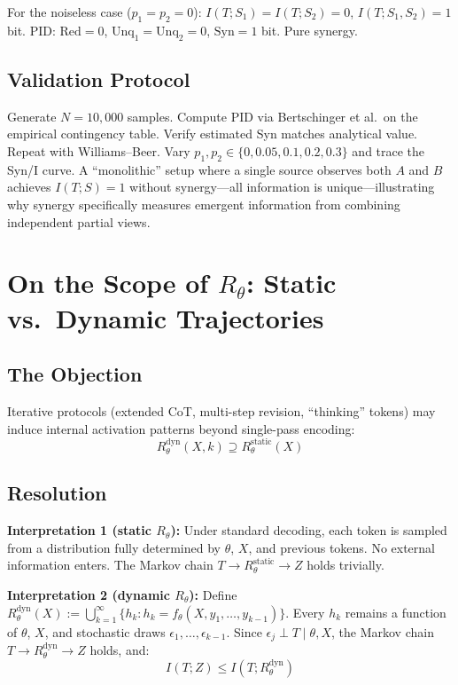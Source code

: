 \documentclass[11pt,a4paper]{article}
\theoremstyle{definition}
\newcommand{\Rtheta}{R_\theta}
\begin{document}
For the noiseless case ($p_1 = p_2 = 0$): $I(T;S_1) = I(T;S_2) = 0$, $I(T;S_1,S_2) = 1$ bit. PID: $\mathrm{Red}=0$, $\mathrm{Unq}_1=\mathrm{Unq}_2=0$, $\mathrm{Syn}=1$ bit. Pure synergy.

\subsection{Validation Protocol}

Generate $N=10{,}000$ samples. Compute PID via Bertschinger et al.\ on the empirical contingency table. Verify estimated Syn matches analytical value. Repeat with Williams--Beer. Vary $p_1, p_2 \in \{0, 0.05, 0.1, 0.2, 0.3\}$ and trace the Syn/I curve. A ``monolithic'' setup where a single source observes both $A$ and $B$ achieves $I(T;S) = 1$ without synergy---all information is unique---illustrating why synergy specifically measures emergent information from combining independent partial views.


\section{On the Scope of $\Rtheta$: Static vs.\ Dynamic Trajectories}
\label{app:dynamic}

\subsection{The Objection}

Iterative protocols (extended CoT, multi-step revision, ``thinking'' tokens) may induce internal activation patterns beyond single-pass encoding:
\begin{equation}
R_\theta^\text{dyn}(X, k) \supseteq R_\theta^\text{static}(X)
\end{equation}

\subsection{Resolution}

\textbf{Interpretation 1 (static $\Rtheta$):} Under standard decoding, each token is sampled from a distribution fully determined by $\theta$, $X$, and previous tokens. No external information enters. The Markov chain $T \to R_\theta^\text{static} \to Z$ holds trivially.

\textbf{Interpretation 2 (dynamic $\Rtheta$):} Define $R_\theta^\text{dyn}(X) := \bigcup_{k=1}^{\infty} \{h_k : h_k = f_\theta(X, y_1, \ldots, y_{k-1})\}$. Every $h_k$ remains a function of $\theta$, $X$, and stochastic draws $\epsilon_1, \ldots, \epsilon_{k-1}$. Since $\epsilon_j \perp T \mid \theta, X$, the Markov chain $T \to R_\theta^\text{dyn} \to Z$ holds, and:
\begin{equation}
I(T; Z) \leq I(T; R_\theta^\text{dyn})
\end{equation}
\end{document}
